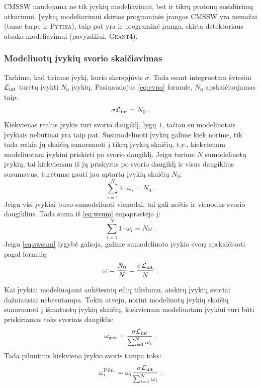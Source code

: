 \documentclass[a4paper, 12pt]{article}
\newcommand{\Lumi}{{\cal L}_\mathrm{int}}
\newlength\q
\begin{document}
CMSSW naudojama ne tik įvykių modeliavimui, bet ir tikrų protonų susidūrimų atkūrimui. Įvykių modeliavimui skirtos programinės įrangos CMSSW yra nemažai (tame tarpe ir \textsc{Pythia}), taip pat yra ir programinė įranga, skirta detektoriaus atsako modeliavimui (pavyzdžiui, \textsc{Geant4})\cite{cmsswev}. 

\subsubsection{Modeliuotų įvykių svorio skaičiavimas}\label{sec:MCweight}

Tarkime, kad tiriame įvykį, kurio skerspjūvis $\sigma$. Tada esant integruotam šviesiui $\Lumi$ turėtų įvykti $N_{0}$ įvykių. Pasinaudojus \eqref{eq:evno} formule, $N_{0}$ apskaičiuojamas taip:
\begin{equation}
\sigma \Lumi=N_{0} \; .
\label{eq:ilumi}
\end{equation}
Kiekvienas realus įvykis turi svorio daugiklį, lygų $1$, tačiau su modeliuotais įvykiais nebūtinai yra taip pat. Susimodeliuoti įvykių galime kiek norime, tik tada reikia jų skaičių sunormuoti į tikrų įvykių skaičių, t.y., kiekvienam modeliuotam įvykiui priskirti po svorio daugiklį. Jeigu turime $N$ sumodeliuotų įvykių, tai kiekvienam iš jų priskyrus po svorio daugiklį ir visus daugiklius susumavus, turėtume gauti jau aptartą įvykių skaičių $N_{0}$:
\begin{equation}
\sum_{i=1}^{N}1\cdot \omega_{i}=N_{0} \; .
\label{eq:wsum}
\end{equation}
Jeigu visi įvykiai buvo sumodeliuoti vienodai, tai gali neštis ir vienodus svorio daugiklius. Tada suma iš \eqref{eq:wsum} supaprastėja į:
\begin{equation}
\sum_{i=1}^{N}1\cdot \omega_{i}=N\omega \; .
\label{eq:swsum}
\end{equation}
Jeigu \eqref{eq:swsum} lygybė galioja, galime sumodeliuoto įvykio svorį apskaičiuoti pagal formulę:
\begin{equation}
\omega=\frac{N_{0}}{N}=\frac{\sigma \Lumi}{N} \; .
\label{eq:weight}
\end{equation}

Kai įvykiai modeliuojami aukštesnių eilių tikslumu, atskirų įvykių svoriai dažniausiai nebesutampa. Tokiu atveju, norint modeliuotų įvykių skaičių sunormuoti į išmatuotų įvykių skaičių, kiekvienam modeliuotam įvykiui  turi būti priskiriamas toks svorinis daugiklis:
\begin{equation}
\omega_{\mathrm{gen}}=\frac{\sigma\Lumi}{\sum_{i=1}^{N}\omega_{i}} \; .
\label{eq:weightnlo}
\end{equation}
Tada pilnutinis kiekvieno įvykio svoris tampa toks:
\begin{equation}
\omega_{i}^{\mathrm{Piln.}}=\omega_{i}\frac{\sigma\Lumi}{\sum_{i=1}^{N}\omega_{i}} \; .
\end{equation}
\end{document}
